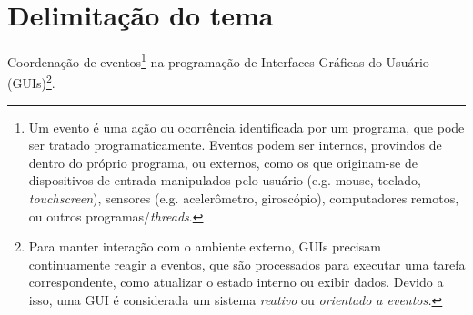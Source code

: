 \section{Delimitação do tema}\label{ldelimitacao}

Coordenação de eventos\footnote{
  Um evento é uma ação ou ocorrência identificada por um
  programa, que pode ser tratado programaticamente.
  Eventos podem ser internos, provindos de dentro do próprio programa,
  ou externos, como os que originam-se de dispositivos de entrada manipulados
  pelo usuário (e.g. mouse, teclado, \emph{touchscreen}),
  sensores (e.g. acelerômetro, giroscópio),
  computadores remotos, ou outros programas/\emph{threads}.
} na programação de Interfaces Gráficas do Usuário (GUIs)\footnote{
  Para manter interação com o ambiente externo, GUIs
  precisam continuamente reagir a eventos, que são processados para
  executar uma tarefa correspondente, como atualizar o estado interno
  ou exibir dados.
  Devido a isso, uma GUI é considerada um sistema \emph{reativo}
  ou \emph{orientado a eventos.}
}.
